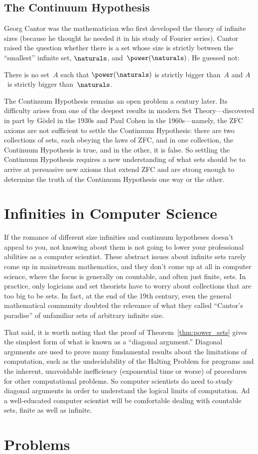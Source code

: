 \subsection{The Continuum Hypothesis}

Georg Cantor was the mathematician who first developed the theory of
infinite sizes (because he thought he needed it in his study of
Fourier series).  Cantor raised the question whether there is a set
whose size is strictly between the ``smallest'' infinite set,
$\naturals$, and~$\power(\naturals)$. He guessed not:
\begin{cont_hypo*}
There is no set~$A$ such that $\power(\naturals)$ is strictly bigger
than~$A$ and $A$~is strictly bigger than~$\naturals$.
\end{cont_hypo*}

The Continuum Hypothesis remains an open problem a century later.  Its
difficulty arises from one of the deepest results in modern Set
Theory---discovered in part by G\"odel in the 1930s and Paul Cohen in
the 1960s---namely, the ZFC axioms are not sufficient to settle the
Continuum Hypothesis: there are two collections of sets, each obeying
the laws of ZFC, and in one collection, the Continuum Hypothesis is
true, and in the other, it is false.  So settling the Continuum
Hypothesis requires a new understanding of what sets should be to
arrive at persuasive new axioms that extend ZFC and are strong enough
to determine the truth of the Continuum Hypothesis one way or the
other.

\section{Infinities in Computer Science}

If the romance of different size infinities and continuum hypotheses
doesn't appeal to you, not knowing about them is not going to lower
your professional abilities as a computer scientist.  These abstract
issues about infinite sets rarely come up in mainstream mathematics,
and they don't come up at all in computer science, where the focus is
generally on countable, and often just finite, sets.  In practice,
only logicians and set theorists have to worry about collections that
are too big to be sets.  In fact, at the end of the 19th century, even
the general mathematical community doubted the relevance of what they
called ``Cantor's paradise'' of unfamiliar sets of arbitrary infinite
size.

That said, it is worth noting that the proof of
Theorem~\ref{thm:power_sets} gives the simplest form of what is known
as a ``diagonal argument.''  Diagonal arguments are used to prove many
fundamental results about the limitations of computation, such as the
undecidability of the Halting Problem for programs and the inherent,
unavoidable inefficiency (exponential time or worse) of procedures for
other computational problems.  So computer scientists do need to study
diagonal arguments in order to understand the logical limits of
computation.  Ad a well-educated computer scientist will be
comfortable dealing with countable sets, finite as well as infinite.

\section{Problems}

\endinput
